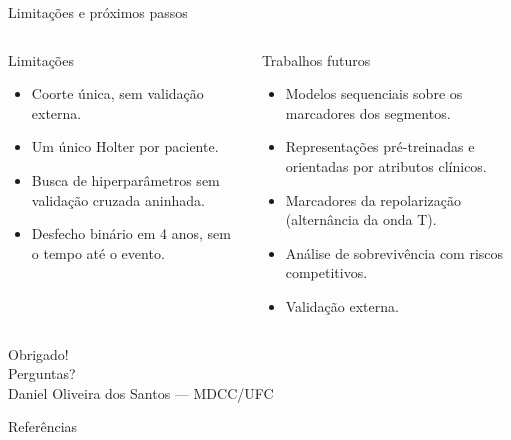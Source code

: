 \documentclass[10pt,aspectratio=169]{beamer}
\begin{document}
\begin{frame}{Limitações e próximos passos}
  \begin{columns}[T]
    \begin{block}{Limitações}
      \footnotesize
      \begin{itemize}
        \item Coorte única, sem validação externa.
        \item Um único Holter por paciente.
        \item Busca de hiperparâmetros sem validação cruzada aninhada.
        \item Desfecho binário em 4 anos, sem o tempo até o evento.
      \end{itemize}
    \end{block}
    \begin{block}{Trabalhos futuros}
      \footnotesize
      \begin{itemize}
        \item Modelos sequenciais sobre os marcadores dos segmentos.
        \item Representações pré-treinadas e orientadas por atributos clínicos.
        \item Marcadores da repolarização (alternância da onda T).
        \item Análise de sobrevivência com riscos competitivos.
        \item Validação externa.
      \end{itemize}
    \end{block}
  \end{columns}
\end{frame}

\begin{frame}[standout]
  Obrigado!\\[0.4cm]
  {\normalsize Perguntas?}\\[0.4cm]
  {\small Daniel Oliveira dos Santos --- MDCC/UFC}
\end{frame}

\appendix

\begin{frame}[allowframebreaks]{Referências}
  \footnotesize
  
\end{frame}
\end{document}
